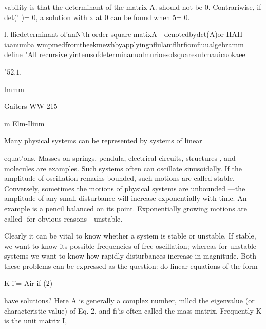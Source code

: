 vability is that the determinant of the matrix A. should not be 0.
Contrariwise, if det(' )= 0, a solution with x at 0 can be found
when 5= 0.

 

 

l. fliedeterminant ol'anN'th-order square matixA - denotedbydct(A)or HAII - iaanumba
wmpmedfromtheekmewhbyapplyingnflulamflhrﬁomﬁuualgebramm
deﬁne "All recursivelyintemsofdeterminanuolmurioesolsquaresubmauicuokaee

"$52.1.$

lmmm

Gaiters-WW 215

m Elm-Ilium

Many physical systems can be represented by systems of linear

equat'ons. Masses on springs, pendula, electrical circuits,
structures , and molecules are examples. Such systems often can
oscillate sinusoidally. If the amplitude of oscillation remains
bounded, such motions are called stable. Conversely, sometimes
the motions of physical systems are unbounded —the amplitude
of any small disturbance will increase exponentially with time. An
example is a pencil balanced on its point. Exponentially growing
motions are called -for obvious reasons - unstable.

Clearly it can be vital to know whether a system is stable or
unstable. If stable, we want to know its possible frequencies of
free oscillation; whereas for unstable systems we want to know
how rapidly disturbances increase in magnitude. Both these
problems can be expressed as the question: do linear equations
of the form

K-i'= Air-if (2)

have solutions? Here A is generally a complex number, mllcd the
eigenvalue (or characteristic value) of Eq. 2, and ﬁ'is often called
the mass matrix. Frequently K is the unit matrix I,

